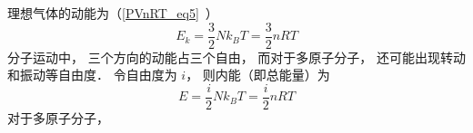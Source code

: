 
\begin{issues}
\issueDraft
\end{issues}


理想气体的动能为（\autoref{PVnRT_eq5}~）
\begin{equation}
E_k = \frac32 Nk_B T = \frac{3}{2}nRT
\end{equation}
分子运动中， 三个方向的动能占三个自由， 而对于多原子分子， 还可能出现转动和振动等自由度． 令自由度为 $i$， 则内能（即总能量）为
\begin{equation}\label{IdgEng_eq1}
E = \frac{i}{2}Nk_B T = \frac{i}{2}nRT
\end{equation}
对于多原子分子，
